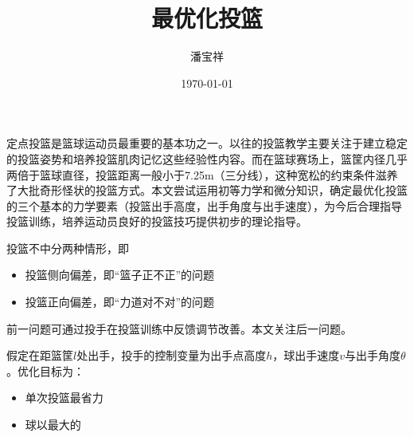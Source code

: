 \documentclass{article}
\begin{document}
\begin{CJK}{UTF8}{gkai}
\title{最优化投篮}
\date{\today}
\author{潘宝祥}
\maketitle
定点投篮是篮球运动员最重要的基本功之一。以往的投篮教学主要关注于建立稳定的投篮姿势和培养投篮肌肉记忆这些经验性内容。而在篮球赛场上，篮筐内径几乎两倍于篮球直径，投篮距离一般小于7.25m（三分线），这种宽松的约束条件滋养了大批奇形怪状的投篮方式。本文尝试运用初等力学和微分知识，确定最优化投篮的三个基本的力学要素（投篮出手高度，出手角度与出手速度），为今后合理指导投篮训练，培养运动员良好的投篮技巧提供初步的理论指导。

投篮不中分两种情形，即
\begin{itemize}
\item 投篮侧向偏差，即“篮子正不正”的问题
\item 投篮正向偏差，即“力道对不对”的问题
\end{itemize}
前一问题可通过投手在投篮训练中反馈调节改善。本文关注后一问题。

假定在距篮筐$l$处出手，投手的控制变量为出手点高度$h$，球出手速度$v$与出手角度$\theta$。优化目标为：
\begin{itemize}
\item 单次投篮最省力
\item 球以最大的
\end{itemize}


\end{CJK} 
\end{document}
